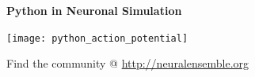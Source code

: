 


\raggedcolumns




\begin{multicols}{3}    %

\begin{center}\Large \textbf{Python in Neuronal Simulation}\end{center}

\begin{center}
\noindent
\texttt{[image: python\_action\_potential]}

Find the community @ \url{http://neuralensemble.org}


\end{center}
\vspace{0em}





% 
% 


\end{multicols}
